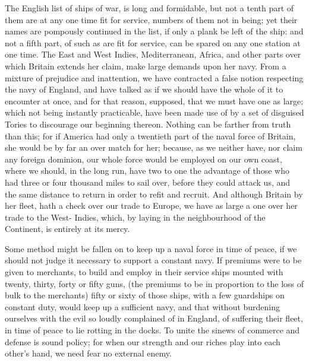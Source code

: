 \documentclass[12pt,oneside]{memoir}
\begin{document}
The English list of ships of war, is long and formidable, but not a tenth part of them are at any one time fit for service, numbers of them not in being; yet their names are pompously continued in the list, if only a plank be left of the ship: and not a fifth part, of such as are fit for service, can be spared on any one station at one time. The East and West Indies, Mediterranean, Africa, and other parts over which Britain extends her claim, make large demands upon her navy. From a mixture of prejudice and inattention, we have contracted a false notion respecting the navy of England, and have talked as if we should have the whole of it to encounter at once, and for that reason, supposed, that we must have one as large; which not being instantly practicable, have been made use of by a set of disguised Tories to discourage our beginning thereon. Nothing can be farther from truth than this; for if America had only a twentieth part of the naval force of Britain, she would be by far an over match for her; because, as we neither have, nor claim any foreign dominion, our whole force would be employed on our own coast, where we should, in the long run, have two to one the advantage of those who had three or four thousand miles to sail over, before they could attack us, and the same distance to return in order to refit and recruit. And although Britain by her fleet, hath a check over our trade to Europe, we have as large a one over her trade to the West- Indies, which, by laying in the neighbourhood of the Continent, is entirely at its mercy.

Some method might be fallen on to keep up a naval force in time of peace, if we should not judge it necessary to support a constant navy. If premiums were to be given to merchants, to build and employ in their service ships mounted with twenty, thirty, forty or fifty guns, (the premiums to be in proportion to the loss of bulk to the merchants) fifty or sixty of those ships, with a few guardships on constant duty, would keep up a sufficient navy, and that without burdening ourselves with the evil so loudly complained of in England, of suffering their fleet, in time of peace to lie rotting in the docks. To unite the sinews of commerce and defense is sound policy; for when our strength and our riches play into each other's hand, we need fear no external enemy.
\end{document}
